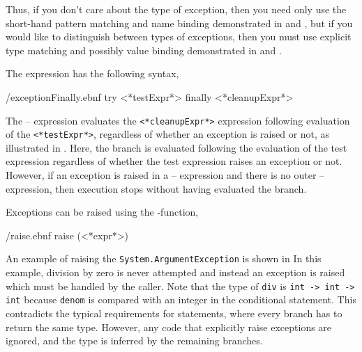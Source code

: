 \documentclass[fsharpNotes.tex]{subfiles}
\begin{document}
Thus, if you don't care about the type of exception, then you need only use the short-hand pattern matching and name binding demonstrated in  and , but if you would like to distinguish between types of exceptions, then you must use explicit type matching and possibly value binding demonstrated in  and .

The  expression has the following syntax,
%
\begin{verbatimwrite}{\ebnf/exceptionFinally.ebnf}
try
   <*testExpr*>
finally
   <*cleanupExpr*>
\end{verbatimwrite}
%
The -- expression evaluates the \lstinline[language=syntax]{<*cleanupExpr*>} expression following evaluation of the \lstinline[language=syntax]{<*testExpr*>}, regardless of whether an exception is raised or not, as illustrated in .
%
%
Here, the  branch is evaluated following the evaluation of the test expression regardless of whether the test expression raises an exception or not. However, if an exception is raised in a -- expression and there is no outer -- expression, then execution stops without having evaluated the  branch.


Exceptions can be raised using the -function,
%
\begin{verbatimwrite}{\ebnf/raise.ebnf}
raise (<*expr*>)
\end{verbatimwrite}
%
An example of raising the \lstinline{System.ArgumentException} is shown in 
% 
%
In this example, division by zero is never attempted and instead an exception is raised which must be handled by the caller. Note that the type of \lstinline!div! is \lstinline!int -> int -> int! because \lstinline{denom} is compared with an integer in the conditional statement. This contradicts the typical requirements for  statements, where every branch has to return the same type. However, any code that explicitly raise exceptions are ignored, and the type is inferred by the remaining branches.
\end{document}
